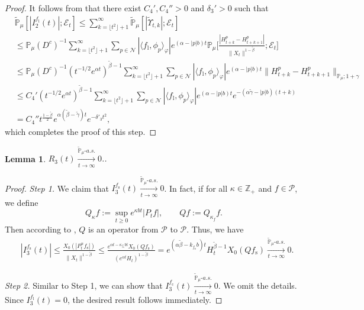 \documentclass[12pt,a4paper]{amsart}
\theoremstyle{plain}
\newtheorem{lem}[thm]{Lemma}
\theoremstyle{definition}
\numberwithin{equation}{section}
\begin{document}
\begin{proof}
 It follows from \cite[Lemma 3.3]{RenSongSunZhao2019Stable} that there exist $C_4',C_4''>0$ and $\delta_3'>0$ such that
  \begin{align}
    &\widetilde {\mathbb {P}}_\mu[ | I_{2}^{f_\mathrm l}(t)|; \mathcal {E}_t]
      \leq \sum_{k = \lfloor t^2\rfloor+1}^\infty \widetilde {\mathbb {P}}_\mu[ |\widetilde {\Upsilon}_{t,k}|; \mathcal {E}_t]
    \\ & \leq \mathbb P_\mu(D^c)^{-1} \sum_{k = \lfloor t^2\rfloor+1}^\infty \sum_{p \in \mathcal N} |\langle f_\mathrm l,\phi_p\rangle_\varphi| e^{(\alpha - |p|b)t}\mathbb {P}_\mu\Big[\frac{ |H_{t+k}^p - H_{t+k+1}^p|}{\|X_t\|^{1- \tilde \beta}}; \mathcal E_t\Big]
    \\ & \leq \mathbb P_\mu(D^c)^{-1} (t^{-1/2}e^{\alpha t})^{\tilde{\beta}-1} \sum_{k = \lfloor t^2\rfloor+1}^\infty \sum_{p \in \mathcal N} |\langle f_\mathrm l,\phi_p\rangle_\varphi| e^{(\alpha - |p|b)t}\|H_{t+k}^p - H_{t+k+1}^p\|_{\mathbb P_\mu; 1+\gamma}
    \\ & \leq C_4' (t^{-1/2}e^{\alpha t})^{\tilde{\beta}-1} \sum_{k = \lfloor t^2\rfloor+1}^\infty \sum_{p \in \mathcal N} |\langle f_\mathrm l,\phi_p\rangle_\varphi| e^{(\alpha - |p|b)t} e^{- (\alpha \tilde \gamma - |p|b)(t+k)}
    \\ & = C_4''t^{\frac{1-\tilde{\beta}}{2}} e^{ \alpha (\tilde \beta - \tilde \gamma) t }e^{- \delta'_3 t^2},
  \end{align}
 which completes the proof of this step.
\end{proof}

\begin{lem}\label{lem: U3T}
 $R_3(t) \xrightarrow[t\to \infty]{\widetilde {\mathbb P}_\mu \text{-} a.s.} 0$..
\end{lem}
\begin{proof}
\emph{Step 1.} We claim that $I^{f_\mathrm s}_3(t) \xrightarrow[t\to \infty]{\widetilde {\mathbb P}_\mu \text{-} a.s.} 0$.
  In fact, if for all $\kappa \in \mathbb Z_+$ and $f\in \mathcal P$, we define
\begin{equation}
\label{eq:Q}
  	Q_\kappa f
  	:= \sup_{t\geq 0} e^{\kappa b t}|P_t f|,
  	\qquad  Q f
  	:= Q_{\kappa_f}f.
\end{equation}
	Then according to \cite[Fact 1.2]{MarksMilos2018CLT}, $Q$ is an operator from $\mathcal P$ to $\mathcal P$. Thus,  we have
  \begin{align}
    & |I^{f_\mathrm s}_3(t)|
      \leq \frac{X_0(|P^\alpha_tf_\mathrm s|)}{\|X_t\|^{1 - \tilde \beta }}
      \leq \frac{e^{\alpha t - \kappa_{f_\mathrm s} b t}X_0(Qf_\mathrm s)}{(e^{\alpha t} H_t)^{1 - \tilde \beta}}
      = e^{(\alpha \tilde \beta - k_{f_\mathrm s}b)t} H_t^{\tilde \beta - 1} X_0(Qf_\mathrm s)
      \xrightarrow[t\to \infty]{\widetilde {\mathbb P}_\mu \text{-} a.s.} 0.
  \end{align}

  \emph{Step 2.} Similar to Step 1, we can show that $I^{f_\mathrm c}_3(t) \xrightarrow[t\to \infty]{\widetilde {\mathbb P}_\mu \text{-} a.s.} 0$.
  We omit the details.
Since $I_3^{f_\mathrm l}(t)=0$, the desired result follows immediately.
\end{proof}
\end{document}
